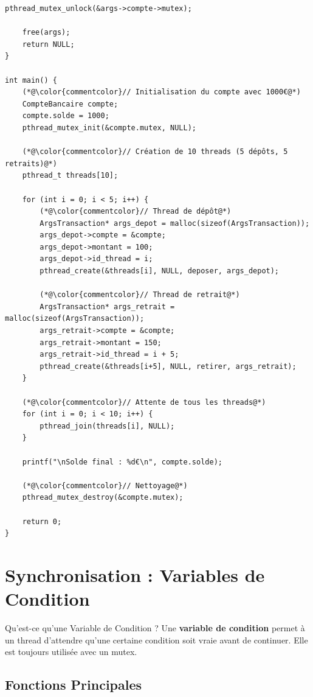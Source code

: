 \documentclass[11pt,a4paper]{article}
\begin{document}
\begin{lstlisting}[caption={Simulation de transactions bancaires}]
    pthread_mutex_unlock(&args->compte->mutex);
    
    free(args);
    return NULL;
}

int main() {
    (*@\color{commentcolor}// Initialisation du compte avec 1000€@*)
    CompteBancaire compte;
    compte.solde = 1000;
    pthread_mutex_init(&compte.mutex, NULL);
    
    (*@\color{commentcolor}// Création de 10 threads (5 dépôts, 5 retraits)@*)
    pthread_t threads[10];
    
    for (int i = 0; i < 5; i++) {
        (*@\color{commentcolor}// Thread de dépôt@*)
        ArgsTransaction* args_depot = malloc(sizeof(ArgsTransaction));
        args_depot->compte = &compte;
        args_depot->montant = 100;
        args_depot->id_thread = i;
        pthread_create(&threads[i], NULL, deposer, args_depot);
        
        (*@\color{commentcolor}// Thread de retrait@*)
        ArgsTransaction* args_retrait = malloc(sizeof(ArgsTransaction));
        args_retrait->compte = &compte;
        args_retrait->montant = 150;
        args_retrait->id_thread = i + 5;
        pthread_create(&threads[i+5], NULL, retirer, args_retrait);
    }
    
    (*@\color{commentcolor}// Attente de tous les threads@*)
    for (int i = 0; i < 10; i++) {
        pthread_join(threads[i], NULL);
    }
    
    printf("\nSolde final : %d€\n", compte.solde);
    
    (*@\color{commentcolor}// Nettoyage@*)
    pthread_mutex_destroy(&compte.mutex);
    
    return 0;
}
\end{lstlisting}

\section{Synchronisation : Variables de Condition}

\begin{definitionbox}{Qu'est-ce qu'une Variable de Condition ?}
Une \textbf{variable de condition} permet à un thread d'attendre qu'une certaine condition soit vraie avant de continuer. Elle est toujours utilisée avec un mutex.
\end{definitionbox}

\subsection{Fonctions Principales}
\end{document}
